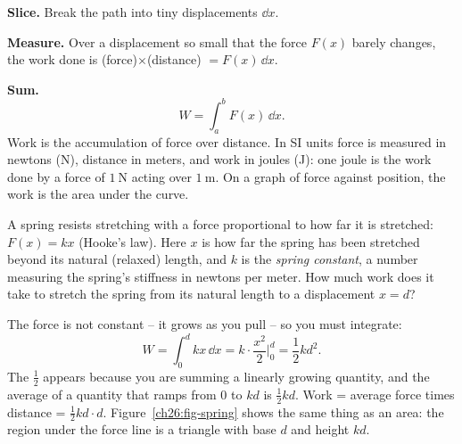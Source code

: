\textbf{Slice.} Break the path into tiny displacements $\dd x$.

\textbf{Measure.} Over a displacement so small that the force $F(x)$ barely
changes, the work done is (force)$\times$(distance) $= F(x)\,\dd x$.

\textbf{Sum.}
\[
  \boxed{\,W = \int_a^b F(x)\,\dd x.\,}
\]
Work is the accumulation of force over distance. In SI units force is measured in
newtons (N), distance in meters, and work in joules (J): one joule is the work done
by a force of $1\ \text{N}$ acting over $1\ \text{m}$. On a graph of force against
position, the work is the area under the curve.

\begin{example}
\label{ch26:ex-spring}
A spring resists stretching with a force proportional to how far it is stretched:
$F(x) = kx$ (Hooke's law). Here $x$ is how far the spring has been stretched
beyond its natural (relaxed) length, and $k$ is the \emph{spring constant}, a
number measuring the spring's stiffness in newtons per meter. How much work does it
take to stretch the spring from its natural length to a displacement $x=d$?

The force is not constant -- it grows as you pull -- so you must integrate:
\[
  W = \int_0^d kx\,\dd x = k\cdot\frac{x^2}{2}\Big|_0^d = \frac{1}{2}kd^2.
\]
The $\tfrac12$ appears because you are summing a
linearly growing quantity, and the average of a quantity that ramps from $0$ to
$kd$ is $\tfrac12 kd$. Work = average force times distance = $\tfrac12 kd\cdot d$.
Figure~\ref{ch26:fig-spring} shows the same thing as an area: the region under the
force line is a triangle with base $d$ and height $kd$.
\end{example}

